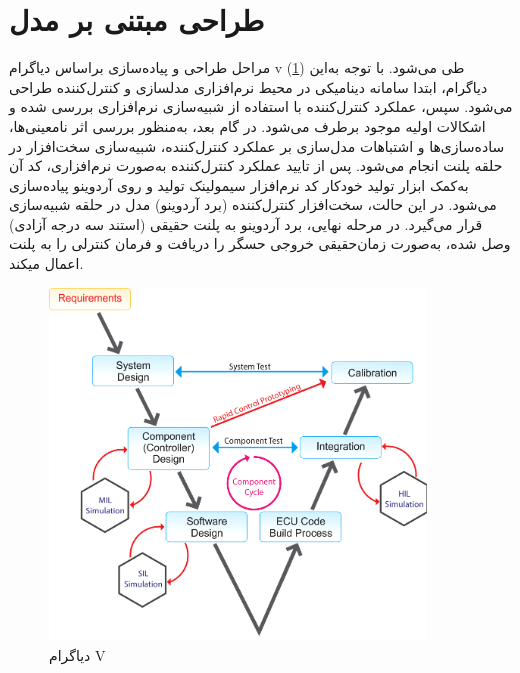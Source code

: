 \section{طراحی مبتنی بر مدل}
مراحل طراحی و پیاده‌سازی براساس دیاگرام v (\ref{Vdiag}) طی می‌شود. با توجه به‌این دیاگرام، ابتدا سامانه دینامیكی در محیط نرم‌افزاری مدلسازی و کنترل‌کننده طراحی می‌شود. سپس،  عملكرد کنترل‌کننده با استفاده از شبیه‌سازی نرم‌افزاری بررسی شده و اشكالات اولیه موجود برطرف می‌شود. در گام بعد، به‌منظور بررسی اثر نامعینی‌ها، ساده‌سازی‌ها و اشتباهات مدل‌سازی بر عملكرد کنترل‌کننده، شبیه‌سازی سخت‌افزار در حلقه پلنت
انجام می‌شود. پس از تایید عملكرد کنترل‌کننده به‌صورت نرم‌افزاری، کد آن به‌کمک ابزار تولید خودکار کد نرم‌افزار سیمولینک تولید و روی آردوینو پیاده‌سازی می‌شود. در این حالت، سخت‌افزار کنترل‌کننده (برد آردوینو) مدل در حلقه شبیه‌سازی قرار می‌گیرد. در مرحله نهایی، برد آردوینو به پلنت حقیقی (استند سه درجه آزادی) وصل شده، به‌صورت
زمان‌حقیقی خروجی حسگر را دریافت و فرمان کنترلی را به پلنت اعمال میکند.
\begin{figure}[H]
	\includegraphics[width=10cm]{../Figures/QuadSimulation/ModelBasedDesign.png}
	\centering
	\caption{دیاگرام V 
		\cite{Vdiagram}}
	\label{Vdiag}
\end{figure}